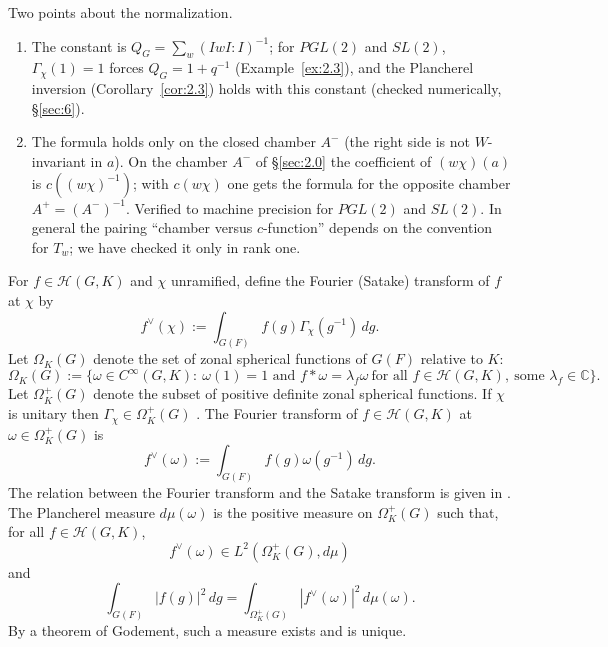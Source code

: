 \documentclass[12pt,letterpaper]{article}
\numberwithin{equation}{section}
\theoremstyle{plain}
\theoremstyle{remark}
\theoremstyle{plain}
\theoremstyle{definition}
\theoremstyle{remark}
\theoremstyle{remark}
\newcommand{\Hc}{\mathcal{H}}
\begin{document}
\begin{rem26}\label{r:mac}
Two points about the normalization.
\begin{enumerate}
\item The constant is $Q_G=\sum_w(IwI:I)^{-1}$; for $PGL(2)$ and $SL(2)$, $\Gamma_\chi(1)=1$ forces $Q_G=1+q^{-1}$ (Example~\ref{ex:2.3}), and the Plancherel inversion (Corollary~\ref{cor:2.3}) holds with this constant (checked numerically, \S\ref{sec:6}).
\item The formula holds only on the closed chamber $A^-$ (the right side is not $W$-invariant in $a$). On the chamber $A^-$ of \S\ref{sec:2.0} the coefficient of $(w\chi)(a)$ is $c((w\chi)^{-1})$; with $c(w\chi)$ one gets the formula for the opposite chamber $A^+=(A^-)^{-1}$. Verified to machine precision for $PGL(2)$ and $SL(2)$. In general the pairing ``chamber versus $c$-function'' depends on the convention for $T_w$; we have checked it only in rank one.
\end{enumerate}
\end{rem26}

For $f\in\Hc(G,K)$ and $\chi$ unramified, define the Fourier (Satake) transform of $f$ at $\chi$ by
\begin{equation}\label{eq:2.9}
f^\vee(\chi):=\int_{G(F)}f(g)\Gamma_\chi(g^{-1})\,dg.
\end{equation}
Let $\Omega_K(G)$ denote the set of zonal spherical functions of $G(F)$ relative to $K$:
\begin{equation}\label{eq:2.10}
\Omega_K(G):=\{\omega\in C^\infty(G,K):\ \omega(1)=1\text{ and }f*\omega=\lambda_f\omega\ \text{for all } f\in\Hc(G,K),\ \text{some }\lambda_f\in\mathbb{C}\}.
\end{equation}
Let $\Omega^+_K(G)$ denote the subset of positive definite zonal spherical functions. If $\chi$ is unitary then $\Gamma_\chi\in\Omega^+_K(G)$ \cite[Thm.~3.3.12]{Ma71}. The Fourier transform of $f\in\Hc(G,K)$ at $\omega\in\Omega_K^+(G)$ is
\begin{equation}\label{eq:2.11}
f^\vee(\omega):=\int_{G(F)}f(g)\omega(g^{-1})\,dg.
\end{equation}
The relation between the Fourier transform and the Satake transform is given in \cite[p.~47]{Ma71}. The Plancherel measure $d\mu(\omega)$ is the positive measure on $\Omega^+_K(G)$ such that, for all $f\in\Hc(G,K)$,
\begin{equation}\label{eq:2.12}
f^\vee(\omega)\in L^2(\Omega^+_K(G),d\mu)
\end{equation}
and
\begin{equation}\label{eq:2.13}
\int_{G(F)}|f(g)|^2\,dg=\int_{\Omega^+_K(G)}|f^\vee(\omega)|^2\,d\mu(\omega).
\end{equation}
By a theorem of Godement, such a measure exists and is unique.
\end{document}
